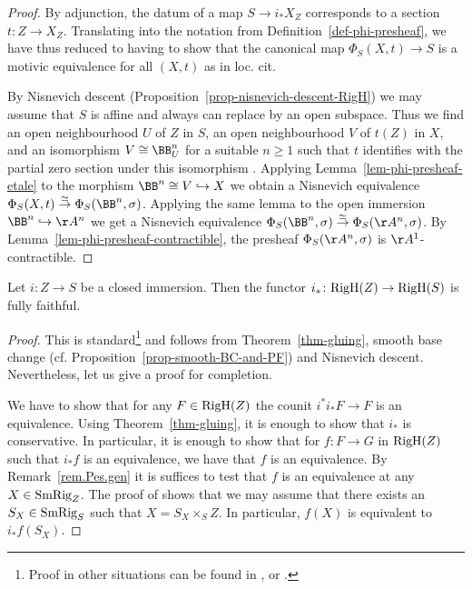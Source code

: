 \documentclass[colorinlistoftodos,article,11pt,reqno]{article}
\newcommand{\RigH}{\textup{RigH}}
\newcommand{\SmRig}{\textup{SmRig}}
\newcommand{\Arig}{\AA^{1}}
\newcommand{\Anrig}{\AA^{n}}
\newcommand{\Bnrig}{\BB^{n}}
\renewcommand{\to}[1][]{\overset{#1}{\rightarrow}}
\newcommand{\inj}[1][]{\overset{#1}{\hookrightarrow}}		%
\begin{document}
\begin{proof}
By adjunction, the datum of a map $S\to i_*X_Z$ corresponds to a section $t\colon Z\to X_Z$. Translating into the notation from Definition~\ref{def-phi-presheaf}, we have thus reduced to having to show that the canonical map $\Phi_S(X,t) \to S$ is a motivic equivalence for all $(X,t)$ as in loc.\! cit.

By Nisnevich descent (Proposition~\ref{prop-nisnevich-descent-RigH}) we may assume that $S$ is affine and always can replace by an open subspace. Thus we find an open neighbourhood $U$ of $Z$ in $S$, an open neighbourhood $V$ of $t(Z)$ in $X$, and an isomorphism $V\cong\Bnrig_U$ for a suitable $n\geq 1$ such that $t$ identifies with the partial zero section under this isomorphism \cite[Prop.~1.3.16]{AGV}. Applying Lemma~\ref{lem-phi-presheaf-etale} to the morphism $\Bnrig\cong V\inj X$ we obtain a Nisnevich equivalence $\Phi_S(X,t)\to[\simeq]\Phi_S(\Bnrig,\sigma)$. Applying the same lemma to the open immersion $\Bnrig\inj\Anrig$ we get a Nisnevich equivalence $\Phi_S(\Bnrig,\sigma)\to[\simeq]\Phi_S(\Anrig,\sigma)$. By Lemma~\ref{lem-phi-presheaf-contractible}, the presheaf $\Phi_S(\Anrig,\sigma)$ is $\Arig$-contractible.
\end{proof}

\begin{cor}
\label{cor-closed-im-ff}
    Let $i\colon Z\rightarrow S$ be a closed immersion. Then the functor $i_{*}\colon \RigH(Z)\to \RigH(S)$ is fully faithful. 
\end{cor}
\begin{proof}
    This is standard\footnote{Proof in other situations can be found in \cite[1.4.23]{AyoubRig}, \cite[Cor. 4.19]{Hoy-EQ} or \cite[Cor. 2.2.2 (1)]{AGV}.} and follows from Theorem~\ref{thm-gluing}, smooth base change (cf. Proposition~\ref{prop-smooth-BC-and-PF}) and Nisnevich descent. Nevertheless, let us give a proof for completion.

    
    We have to show that for any $F\in \RigH(Z)$ the counit $i^{*}i_{*}F\rightarrow F$ is an equivalence. Using Theorem~\ref{thm-gluing}, it is enough to show that $i_{*}$ is conservative. In particular, it is enough to show that for $f\colon F\rightarrow G$ in $\RigH(Z)$ such that $i_{*}f$ is an equivalence, we have that $f$ is an equivalence. By Remark~\ref{rem.Pes.gen} it is suffices to test that $f$ is an equivalence at any $X\in \SmRig_{Z}$. The proof of \cite[Lem. 2.2.5 (2)]{AGV} shows that we may assume that there exists an $S_{X}\in \SmRig_{S}$ such that $X = S_{X}\times_{S} Z$. In particular, $f(X)$ is equivalent to $i_{*}f(S_X)$.
\end{proof}
\end{document}
